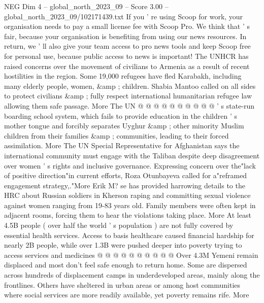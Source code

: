 \begin{textsample}{NEG Dim 4 – global\_north\_2023\_09 – Score 3.00 – global\_north\_2023\_09/102171439.txt}
If you ' re using Scoop for work, your organisation needs to pay a small license fee with Scoop Pro.
We think that ' s fair, because your organisation is benefiting from using our news resources.
In return, we ' ll also give your team access to pro news tools and keep Scoop free for personal use, because public access to news is important!
The UNHCR has raised concerns over the movement of civilians to Armenia as a result of recent hostilities in the region.
Some 19,000 refugees have fled Karabakh, including many elderly people, women, \&amp ; children.
Shabia Mantoo called on all sides to protect civilians \&amp ; fully respect international humanitarian refugee law allowing them safe passage.
More The UN @ @ @ @ @ @ @ @ @ @ ' s state-run boarding school system, which fails to provide education in the children ' s mother tongue and forcibly separates Uyghur \&amp ; other minority Muslim children from their families \&amp ; communities, leading to their forced assimilation.
More The UN Special Representative for Afghanistan says the international community must engage with the Taliban despite deep disagreement over women ' s rights and inclusive governance.
Expressing concern over the"lack of positive direction"in current efforts, Roza Otunbayeva called for a"reframed engagement strategy,."More Erik M? se has provided harrowing details to the HRC about Russian soldiers in Kherson raping and committing sexual violence against women ranging from 19-83 years old.
Family members were often kept in adjacent rooms, forcing them to hear the violations taking place.
More At least 4.5B people ( over half the world ' s population ) are not fully covered by essential health services.
Access to basis healthcare caused financial hardship for nearly 2B people, while over 1.3B were pushed deeper into poverty trying to access services and medicines @ @ @ @ @ @ @ @ @ @ Over 4.3M Yemeni remain displaced and most don't feel safe enough to return home.
Some are dispersed across hundreds of displacement camps in underdeveloped areas, mainly along the frontlines.
Others have sheltered in urban areas or among host communities where social services are more readily available, yet poverty remains rife.
More

\end{textsample}
